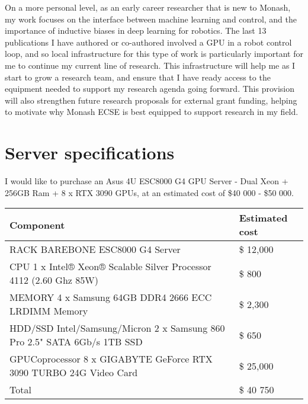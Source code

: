 \documentclass[12pt]{texMemo} %
\begin{document}
On a more personal level, as an early career researcher that is new to Monash, my work focuses on the interface between machine learning and control, and the importance of inductive biases in deep learning for robotics. The last 13 publications I have authored or co-authored involved a GPU in a robot control loop, and so local infrastructure for this type of work is particularly important for me to continue my current line of research. This infrastructure will help me as I start to grow a research team, and ensure that I have ready access to the equipment needed to support my research agenda going forward. This provision will also strengthen future research proposals for external grant funding, helping to motivate why Monash ECSE is best equipped to support research in my field.

\section{Server specifications}

I would like to purchase an Asus 4U ESC8000 G4 GPU Server - Dual Xeon + 256GB Ram + 8 x RTX 3090 GPUs, at an estimated cost of \$40 000 - \$50 000.

\begin{tabular}{l|l}
\textbf{Component} & \textbf{Estimated cost}\\
\hline
\hline
RACK BAREBONE ESC8000 G4 Server & \$ 12,000\\
CPU	 1 x Intel® Xeon® Scalable Silver Processor 4112 (2.60 Ghz 85W) & \$ 800\\
MEMORY 4 x Samsung 64GB DDR4 2666 ECC LRDIMM Memory
& \$ 2,300\\
HDD/SSD Intel/Samsung/Micron 2 x Samsung 860 Pro 2.5" SATA 6Gb/s 1TB SSD &
\$ 650\\
GPU\/Coprocessor	8 x GIGABYTE GeForce RTX 3090 TURBO 24G Video Card & \$ 25,000\\
\hline
Total & \$ 40 750\\
\hline
\end{tabular}

\newpage
\printbibliography
\end{document}
